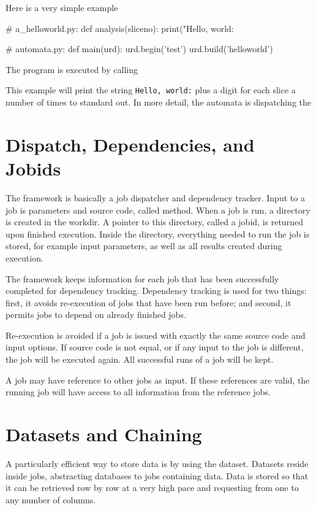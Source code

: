Here is a very simple example
\begin{python}
# a_helloworld.py:
def analysis(sliceno):
  print("Hello, world: %

# automata.py:
def main(urd):
  urd.begin('test')
  urd.build('helloworld')
\end{python}
The program is executed by calling
\begin{shell}
\end{shell}
This example will print the string \texttt{Hello, world:} plus a digit
for each slice a number of
times to standard
out.  In more detail, the automata is dispatching the



\section{Dispatch, Dependencies, and Jobids}

The framework is basically a job dispatcher and dependency tracker.
Input to a job is parameters and source code, called method.  When a
job is run, a directory is created in the workdir.  A pointer to this
directory, called a jobid, is returned upon finished execution.
Inside the directory, everything needed to run the job is stored, for
example input parameters, as well as all results created during
execution.

The framework keeps information for each job that has been
successfully completed for dependency tracking.  Dependency tracking
is used for two things: first, it avoids re-execution of jobs that
have been run before; and second, it permits jobs to depend on already
finished jobs.

Re-execution is avoided if a job is issued with exactly the same
source code and input options.  If source code is not equal, or if any
input to the job is different, the job will be executed again.  All
successful runs of a job will be kept.

A job may have reference to other jobs as input.  If these references
are valid, the running job will have access to all information from
the reference jobs.



\section{Datasets and Chaining}

A particularly efficient way to store data is by using the dataset.
Datasets reside inside jobs, abstracting databases to jobs containing
data.  Data is stored so that it can be retrieved row by row at a very
high pace and requesting from one to any number of columns.

